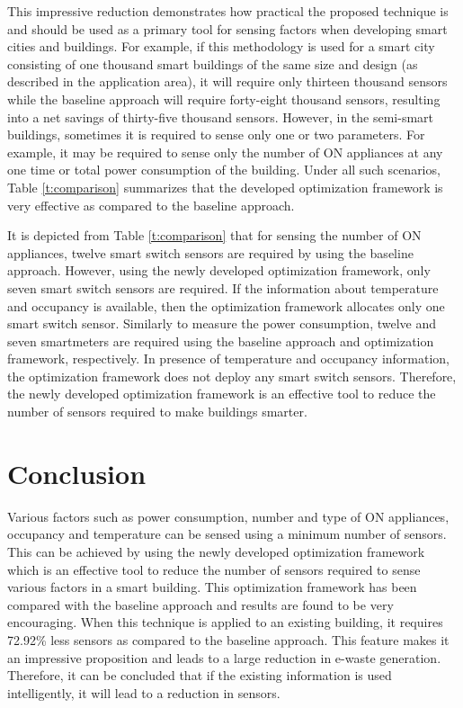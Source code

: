 \documentclass[]{interact}
\theoremstyle{plain}%
\theoremstyle{definition}
\theoremstyle{remark}
\begin{document}
This impressive reduction demonstrates how practical the proposed technique is and should be used as a primary tool for sensing factors when developing smart cities and buildings. For example, if this methodology is used for a smart city consisting of one thousand smart buildings of the same size and design (as described in the application area), it will require only thirteen thousand sensors while the baseline approach will require forty-eight thousand sensors, resulting into a net savings of thirty-five thousand sensors.   
However, in the semi-smart buildings, sometimes it is required to sense only one or two parameters. For example, it may be required to sense only the number of ON appliances at any one time or total power consumption of the building. Under all such scenarios, Table \ref{t:comparison} summarizes that the developed optimization framework is very effective as compared to the baseline approach.

It is depicted from Table \ref{t:comparison} that for sensing the number of ON appliances, twelve smart switch sensors are required by using the baseline approach. However,  using the newly developed optimization framework, only seven smart switch sensors are required. If the information about temperature and occupancy is available, then the optimization framework allocates only one smart switch sensor.  
Similarly to measure the power consumption, twelve and seven smartmeters are required using the baseline approach and optimization framework, respectively. In presence of temperature and occupancy information, the optimization framework does not deploy any smart switch sensors.
Therefore, the newly developed optimization framework is an effective tool to reduce the number of sensors required to make buildings smarter.

\section{Conclusion}

Various factors such as power consumption, number and type of ON appliances, occupancy and temperature can be sensed using a minimum number of sensors.  This can be achieved by using the newly developed optimization framework which is an effective tool to reduce the number of sensors required to sense various factors in a smart building. This optimization framework has been compared with the baseline approach and results are found to be very encouraging. When this technique is applied to an existing building, it requires 72.92\% less sensors as compared to the baseline approach. This feature makes it an impressive proposition and leads to a large reduction in e-waste generation. Therefore, it can be concluded that if the existing information is used intelligently, it will lead to a reduction in sensors. 
\end{document}
